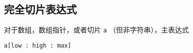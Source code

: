 \subsection{完全切片表达式}
对于数组，数组指针，或者切片 \lstinline|a| （但非字符串），主表达式
\begin{lstlisting}[style=golang]
a[low : high : max]
\end{lstlisting}










































